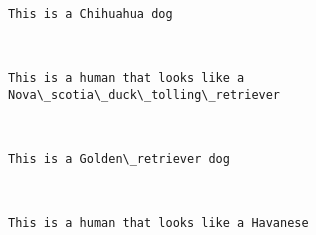 \documentclass[11pt]{article}
\begin{document}
    \begin{center}
    \end{center}
    { \hspace*{\fill} \\}
    
    \begin{Verbatim}[commandchars=\\\{\}]
This is a Chihuahua dog

    \end{Verbatim}

    \begin{center}
    \end{center}
    { \hspace*{\fill} \\}
    
    \begin{Verbatim}[commandchars=\\\{\}]
This is a human that looks like a Nova\_scotia\_duck\_tolling\_retriever

    \end{Verbatim}

    \begin{center}
    \end{center}
    { \hspace*{\fill} \\}
    
    \begin{Verbatim}[commandchars=\\\{\}]
This is a Golden\_retriever dog

    \end{Verbatim}

    \begin{center}
    \end{center}
    { \hspace*{\fill} \\}
    
    \begin{Verbatim}[commandchars=\\\{\}]
This is a human that looks like a Havanese

    \end{Verbatim}
\end{document}
